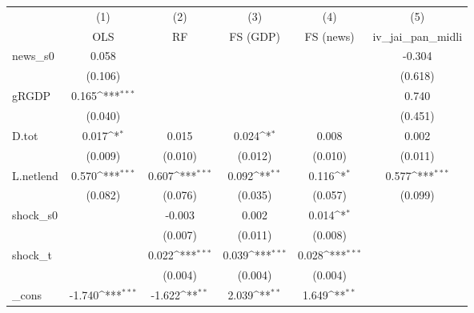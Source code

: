 {
\def\sym#1{\ifmmode^{#1}\else\(^{#1}\)\fi}
\begin{tabular}{l*{5}{c}}
\toprule
            &\multicolumn{1}{c}{(1)}&\multicolumn{1}{c}{(2)}&\multicolumn{1}{c}{(3)}&\multicolumn{1}{c}{(4)}&\multicolumn{1}{c}{(5)}\\
            &\multicolumn{1}{c}{OLS}&\multicolumn{1}{c}{RF}&\multicolumn{1}{c}{FS (GDP)}&\multicolumn{1}{c}{FS (news)}&\multicolumn{1}{c}{iv\_jai\_pan\_midli}\\
\midrule
news\_s0     &       0.058         &                     &                     &                     &      -0.304         \\
            &     (0.106)         &                     &                     &                     &     (0.618)         \\
\addlinespace
gRGDP       &       0.165\sym{***}&                     &                     &                     &       0.740         \\
            &     (0.040)         &                     &                     &                     &     (0.451)         \\
\addlinespace
D.tot       &       0.017\sym{*}  &       0.015         &       0.024\sym{*}  &       0.008         &       0.002         \\
            &     (0.009)         &     (0.010)         &     (0.012)         &     (0.010)         &     (0.011)         \\
\addlinespace
L.netlend   &       0.570\sym{***}&       0.607\sym{***}&       0.092\sym{**} &       0.116\sym{*}  &       0.577\sym{***}\\
            &     (0.082)         &     (0.076)         &     (0.035)         &     (0.057)         &     (0.099)         \\
\addlinespace
shock\_s0    &                     &      -0.003         &       0.002         &       0.014\sym{*}  &                     \\
            &                     &     (0.007)         &     (0.011)         &     (0.008)         &                     \\
\addlinespace
shock\_t     &                     &       0.022\sym{***}&       0.039\sym{***}&       0.028\sym{***}&                     \\
            &                     &     (0.004)         &     (0.004)         &     (0.004)         &                     \\
\addlinespace
\_cons      &      -1.740\sym{***}&      -1.622\sym{**} &       2.039\sym{**} &       1.649\sym{**} &                     \\

\end{tabular}}
